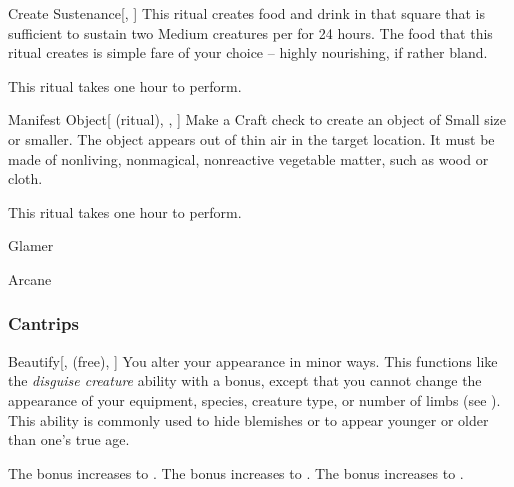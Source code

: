 \lowercase{\hypertarget{spell:Create Sustenance}{}}\label{spell:Create Sustenance}
\begin{apability}[Rank 3]{\hypertarget{spell:Create Sustenance}{Create Sustenance}}[, ]
This ritual creates food and drink in that square that is sufficient to sustain two Medium creatures per  for 24 hours.
The food that this ritual creates is simple fare of your choice -- highly nourishing, if rather bland.

This ritual takes one hour to perform.
\end{apability}
\vspace{0.25em}



\lowercase{\hypertarget{spell:Manifest Object}{}}\label{spell:Manifest Object}
\begin{attuneability}[Rank 3]{\hypertarget{spell:Manifest Object}{Manifest Object}}[ (ritual), , ]
Make a Craft check to create an object of Small size or smaller.
The object appears out of thin air in the target location.
It must be made of nonliving, nonmagical, nonreactive vegetable matter, such as wood or cloth.

This ritual takes one hour to perform.
\end{attuneability}
\vspace{0.25em}


\newpage
\begin{spellsection}{Glamer}

\begin{spellheader}
\end{spellheader}


 Arcane

\subsubsection{Cantrips}


\begin{freeability}{Beautify}[,  (free), ]
You alter your appearance in minor ways.
This functions like the \textit{disguise creature}  ability with a  bonus, except that you cannot change the appearance of your equipment, species, creature type, or number of limbs (see ).
This ability is commonly used to hide blemishes or to appear younger or older than one's true age.

\rankline
{} The bonus increases to .
 The bonus increases to .
 The bonus increases to .
\end{freeability}

\end{spellsection}


